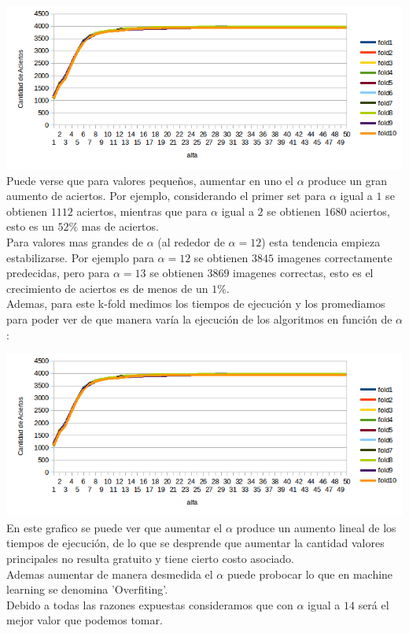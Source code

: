 \includegraphics[scale=0.75]{nuevosResultados/pca/pca1.png}\\
Puede verse que para valores pequeños, aumentar en uno el $\alpha$ produce un gran aumento de aciertos. Por ejemplo, considerando el primer set para $\alpha$ igual a $1$ se obtienen $1112$ aciertos, mientras que para $\alpha$ igual a $2$ se obtienen $1680$ aciertos, esto es un $52\%$ mas de aciertos.
\\
Para valores mas grandes de $\alpha$ (al rededor de $\alpha = 12$) esta tendencia empieza estabilizarse. Por ejemplo para $\alpha = 12$ se obtienen $3845$ imagenes correctamente predecidas, pero para $\alpha = 13$ se obtienen $3869$ imagenes correctas, esto es el crecimiento de aciertos es de menos de un $1\%$.
\\
Ademas, para este k-fold medimos los tiempos de ejecución y los promediamos para poder ver de que manera varía la ejecución de los algoritmos en función de $\alpha$:

\includegraphics[scale=0.75]{nuevosResultados/pca/pca1.png}\\

En este grafico se puede ver que aumentar el $\alpha$ produce un aumento lineal de los tiempos de ejecución, de lo que se desprende que aumentar la cantidad valores principales no resulta gratuito y tiene cierto costo asociado.
\\
Ademas aumentar de manera desmedida el $\alpha$ puede probocar lo que en machine learning se denomina 'Overfiting'.
\inventarReferencia
\\
Debido a todas las razones expuestas consideramos que con $\alpha$ igual a $14$ será el mejor valor que podemos tomar.
\\

